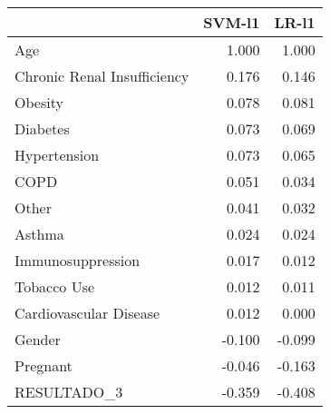 \begin{tabular}{lrr}
\toprule
{} &  SVM-l1 &  LR-l1 \\
\midrule
Age                         &   1.000 &  1.000 \\
Chronic Renal Insufficiency &   0.176 &  0.146 \\
Obesity                     &   0.078 &  0.081 \\
Diabetes                    &   0.073 &  0.069 \\
Hypertension                &   0.073 &  0.065 \\
COPD                        &   0.051 &  0.034 \\
Other                       &   0.041 &  0.032 \\
Asthma                      &   0.024 &  0.024 \\
Immunosuppression           &   0.017 &  0.012 \\
Tobacco Use                 &   0.012 &  0.011 \\
Cardiovascular Disease      &   0.012 &  0.000 \\
Gender                      &  -0.100 & -0.099 \\
Pregnant                    &  -0.046 & -0.163 \\
RESULTADO\_3                 &  -0.359 & -0.408 \\
\bottomrule
\end{tabular}
